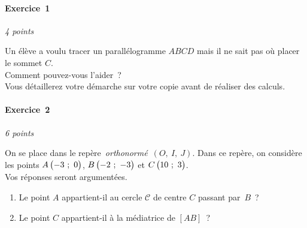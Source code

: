 \documentclass[a4paper,12pt,twocolumn,landscape]{article}
\newcommand{\rep}[3]{~$\left(#1,~#2,~#3\right)$}
\begin{document}
\vspace*{1em}

\begin{minipage}{0.45\textwidth}
\thispagestyle{firststyle}

\vspace*{1em}

\paragraph{Exercice~1} \hfill \emph{4 points}

Un élève a voulu tracer un parallélogramme $ABCD$ mais il ne sait pas où placer le sommet $C$.\\ Comment pouvez-vous l'aider~?\\ Vous détaillerez votre démarche sur votre copie avant de réaliser des calculs.

\begin{center}


\end{center}


\vspace*{2em}

\paragraph{Exercice~2} \hfill \emph{6 points}

On se place dans le repère~\emph{orthonormé}\rep{O}{I}{J}. Dans ce repère, on considère les points $A\begin{pmatrix}-3~;~0\end{pmatrix}$, $B\begin{pmatrix}-2~;~-3\end{pmatrix}$ et $C\begin{pmatrix}10~;~3\end{pmatrix}$.\\Vos réponses seront argumentées.

	\begin{enumerate}
		\item Le point $A$ appartient-il au cercle $\mathscr{C}$ de centre $C$ passant par~$B$~?
		\item Le point $C$ appartient-il à la médiatrice de $\left[AB\right]$~?
	\end{enumerate}



\vspace{-2em}


\end{minipage}
\newpage
\end{document}

